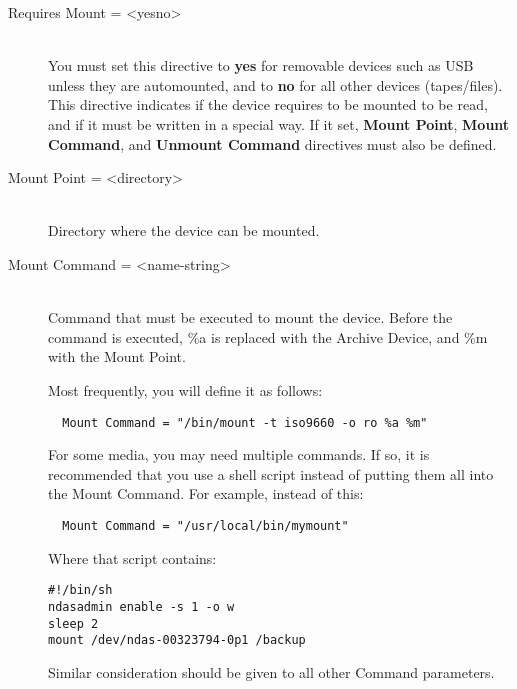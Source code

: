 \begin{description}
\item [Requires Mount = {\textless}yes{\textbar}no{\textgreater}] \hfill \\
You must set this directive to {\bf yes} for removable devices such as
USB unless they are automounted, and to {\bf no} for all other devices
(tapes/files).  This directive indicates if the device requires to be
mounted to be read, and if it must be written in a special way.  If it
set, {\bf Mount Point}, {\bf Mount Command}, and {\bf Unmount Command}
directives must also be defined.

\item [Mount Point = {\textless}directory{\textgreater}] \hfill \\
Directory where the device can be mounted.

\item [Mount Command = {\textless}name-string{\textgreater}] \hfill \\
Command that must be executed to mount the device. Before the command is
executed, \%a is replaced with the Archive Device, and \%m with the Mount
Point.

Most frequently, you will define it as follows:

\footnotesize
\begin{verbatim}
  Mount Command = "/bin/mount -t iso9660 -o ro %a %m"
\end{verbatim}
\normalsize

For some media, you may need multiple commands.  If so, it is recommended
that you use a shell script instead of putting them all into the Mount
Command.  For example, instead of this:

\footnotesize
\begin{verbatim}
  Mount Command = "/usr/local/bin/mymount"
\end{verbatim}
\normalsize

Where that script contains:

\footnotesize
\begin{verbatim}
#!/bin/sh
ndasadmin enable -s 1 -o w
sleep 2
mount /dev/ndas-00323794-0p1 /backup
\end{verbatim}
\normalsize

Similar consideration should be given to all other Command parameters.


\end{description}
